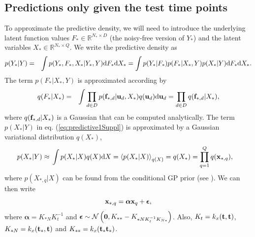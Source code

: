 \documentclass{article} %
\begin{document}
\subsection{Predictions only given the test time points \label{supplUnobservedData}}
To approximate the predictive density, we will need to introduce the underlying latent function values $F_* \in \mathbb{R}^{N_* \times D}$ (the noisy-free version of $Y_*$) and the latent variables $X_* \in \mathbb{R}^{N_* \times Q}$. We  write the predictive density as
\begin{eqnarray}
p(Y_* | Y) & = & \int p(Y_*, F_*, X_*| Y_*, Y)  \text{d}  F_* \text{d}  X_* =  \int p(Y_* | F_*)  p(F_*|X_*, Y) p(X_*|  Y) \text{d}  F_* \text{d}  X_* .
\label{eq:predictive1Suppl}
\end{eqnarray}
The term $p(F_* |X_*, Y)$ is approximated according by
\begin{eqnarray}
q(F_*|X_*) & = & \int \prod_{d \in D} p(\mathbf{f}_{*,d} | \mathbf{u}_d, X_*)  q(\mathbf{u}_d) \text{d}  \mathbf{u}_d 
	    = \prod_{d \in D} q(\mathbf{f}_{*,d} | X_*)  ,
\end{eqnarray}
where $q(\mathbf{f}_{*,d} | X_*)$ is a Gaussian that can be computed analytically.%
The term $p(X_*| Y)$ in eq. (\ref{eq:predictive1Suppl}) is approximated by
a Gaussian variational distribution $q(X_*)$,
%
\begin{align}
p(X_* | Y) \approx {}& \int  p(X_* | X) q(X) \text{d}  X = \left\langle  p(X_* | X) \right\rangle_{q(X)} = q(X_*) = \prod_{q=1}^Q q(\mathbf{x}_{*,q}),\label{qxstarSuppl}
\end{align}
%
where $p( X_{*,q} | X)$ can be found from the conditional GP prior
(see \cite{rasmussen-williams}). We can then write
%
\begin{equation}
\label{qxstar2Suppl}
\mathbf{x}_{*,q} = \boldsymbol \alpha \mathbf{x}_q + \boldsymbol \epsilon,
\end{equation} 
%
where $\boldsymbol \alpha = K_{*N}K_t^{-1}$ and 
$\boldsymbol \epsilon \sim \mathcal{N} \left( \mathbf{0}, K_{**} - K_{*N K_t^{-1} K_{N*}}\right)$. Also, $K_t = k_x(\mathbf{t}, \mathbf{t})$, $K_{*N} = k_x(\mathbf{t}_*, \mathbf{t})$ and $K_{**} = k_x(\mathbf{t}_* \mathbf{t}_*)$. 
\end{document}
